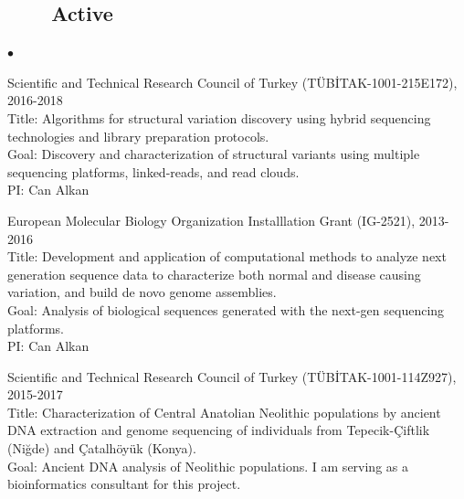 \documentclass[margin,line]{res}
\newenvironment{list2}{
  \begin{list}{$\bullet$}{%
      \setlength{\itemsep}{0in}
      \setlength{\parsep}{0in} \setlength{\parskip}{0in}
      \setlength{\topsep}{0in} \setlength{\partopsep}{0in} 
      \setlength{\leftmargin}{0.2in}}}{\end{list}}
\begin{document}
\begin{resume}
                                       \subsection{\small \sc ~~~~Active}

                                       \begin{list2}
                                       \item
                                         Scientific and Technical Research Council of Turkey (T\"{U}B\.{I}TAK-1001-215E172), 2016-2018\\
                                         Title: Algorithms for structural variation discovery using hybrid sequencing technologies and library preparation protocols.\\
                                         Goal: Discovery and characterization of structural variants using multiple sequencing platforms, linked-reads, and read clouds.\\
                                         PI: Can Alkan
                                       \item
                                         European Molecular Biology Organization Installlation Grant (IG-2521), 2013-2016 \\
                                         Title: Development and application of computational methods to analyze next generation sequence data to characterize both normal and disease causing variation, and build de novo genome assemblies.\\
                                         Goal: Analysis of biological sequences generated with the next-gen sequencing platforms.\\
                                         PI: Can Alkan
                                       \item
                                         Scientific and Technical Research Council of Turkey (T\"{U}B\.{I}TAK-1001-114Z927), 2015-2017\\
                                         Title: Characterization of Central Anatolian Neolithic populations by ancient DNA extraction and genome sequencing of individuals 
                                         from Tepecik-Çiftlik (Niğde) and Çatalhöyük (Konya).\\
                                         Goal: Ancient DNA analysis of Neolithic populations. I am serving as a bioinformatics consultant for this project.\\

\end{list2}
\end{resume}
\end{document}
